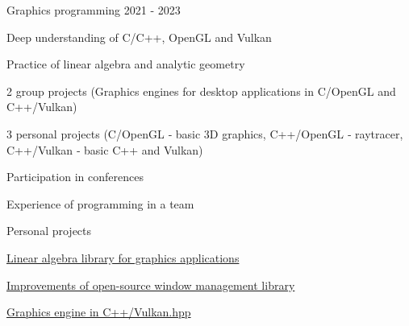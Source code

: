 

\begin{cventries}

  \cventry
    {} %
    {Graphics programming} %
    {} %
    {2021 - 2023} %
    {
      \begin{cvitems} %
        \item {Deep understanding of C/C++, OpenGL and Vulkan}
        \item {Practice of linear algebra and analytic geometry}
        \item {2 group projects (Graphics engines for desktop applications in C/OpenGL and C++/Vulkan)}
        \item {3 personal projects (C/OpenGL ‐ basic 3D graphics, C++/OpenGL ‐ raytracer, C++/Vulkan ‐ basic C++ and Vulkan)}
        \item {Participation in conferences}
        \item {Experience of programming in a team}
      \end{cvitems}
    }

  \cventry
    {} %
    {Personal projects} %
    {} %
    {} %
    {
      \begin{cvitems} %
        \item {\href{https://github.com/4J-company/mr-math}{Linear algebra library for graphics applications}}
        \item {\href{https://github.com/4J-company/mr-window}{Improvements of open-source window management library}}
        \item {\href{https://github.com/4J-company/mr-graphics}{Graphics engine in C++/Vulkan.hpp}}
      \end{cvitems}
    }

\end{cventries}
